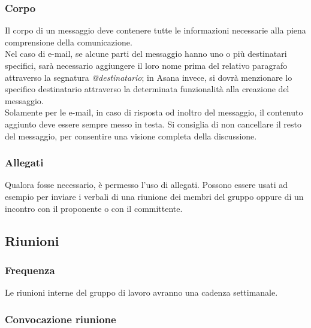 \documentclass[../NormeDiProgetto.tex]{subfiles}
\begin{document}
				\subsubsection{Corpo}
					Il corpo di un messaggio deve contenere tutte le informazioni
					necessarie alla piena comprensione della comunicazione.\\
					Nel caso di e-mail, se alcune parti del messaggio hanno uno o più destinatari specifici,
					sarà necessario aggiungere il loro nome	prima del relativo paragrafo
					attraverso la segnatura	\textit{@destinatario};
					in Asana invece, si dovrà menzionare lo specifico destinatario
					attraverso la determinata funzionalità alla creazione del messaggio.\\
					Solamente per le e-mail, in caso di risposta od inoltro del
					messaggio, il contenuto aggiunto deve essere sempre messo in testa.
					Si consiglia di non cancellare il resto del messaggio,
					per consentire una visione completa della discussione.
				\subsubsection{Allegati}
					Qualora fosse necessario, è permesso l'uso di allegati. Possono
					essere usati ad esempio per inviare i verbali di una riunione dei
					membri del gruppo oppure di un incontro con il proponente o con
					il committente.
					
					
			\subsection{Riunioni}
				\subsubsection{Frequenza}
					Le riunioni interne del gruppo di lavoro avranno una cadenza settimanale.
				\subsubsection{Convocazione riunione}
\end{document}
